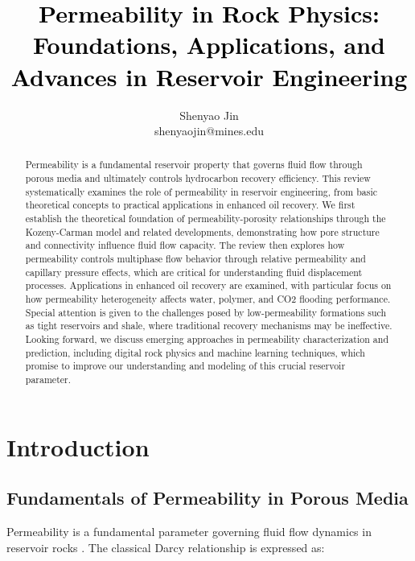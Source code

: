 \documentclass[journal]{IEEEtran}
\begin{document}
\title{\textcolor{black}{Permeability in Rock Physics: Foundations, Applications, and Advances in Reservoir Engineering}}      

\author{Shenyao Jin\\shenyaojin@mines.edu} 

\maketitle

\begin{abstract}
    Permeability is a fundamental reservoir property that governs fluid flow through porous media and ultimately controls hydrocarbon recovery efficiency. This review systematically examines the role of permeability in reservoir engineering, from basic theoretical concepts to practical applications in enhanced oil recovery. We first establish the theoretical foundation of permeability-porosity relationships through the Kozeny-Carman model and related developments, demonstrating how pore structure and connectivity influence fluid flow capacity. The review then explores how permeability controls multiphase flow behavior through relative permeability and capillary pressure effects, which are critical for understanding fluid displacement processes. Applications in enhanced oil recovery are examined, with particular focus on how permeability heterogeneity affects water, polymer, and CO2 flooding performance. Special attention is given to the challenges posed by low-permeability formations such as tight reservoirs and shale, where traditional recovery mechanisms may be ineffective. Looking forward, we discuss emerging approaches in permeability characterization and prediction, including digital rock physics and machine learning techniques, which promise to improve our understanding and modeling of this crucial reservoir parameter.
\end{abstract}

\section{Introduction}

\subsection{Fundamentals of Permeability in Porous Media}

Permeability is a fundamental parameter governing fluid flow dynamics in reservoir rocks \parencite{corsano_low_1996}. The classical Darcy relationship is expressed as:
\end{document}
